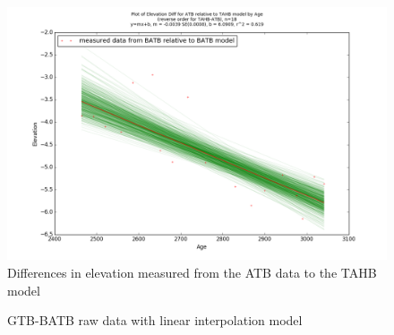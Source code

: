 \begin{figure}[h]
	\includegraphics[width=0.9\linewidth]{data/gias/theGIA_ATB_relative_to_TAHB.png}
	\caption{Differences in elevation measured from the ATB data to the TAHB model}
	\label{fig:gias_ATBxTAHB}
\end{figure}
\newpage






\begin{figure}[h]
	\caption{GTB-BATB raw data with linear interpolation model}
	\label{fig:data_GTBxBATB}
\end{figure}
\newpage

